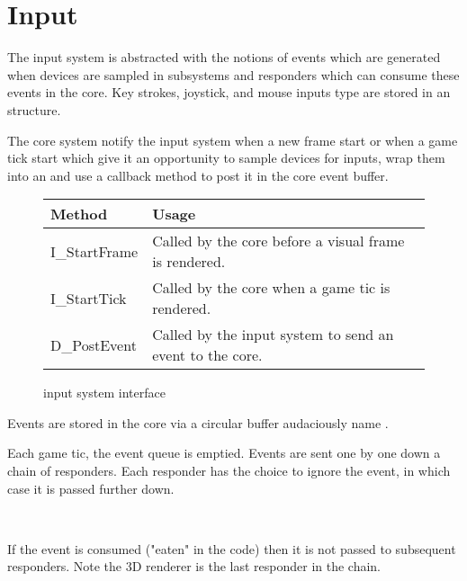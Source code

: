 \section{Input}
The input system is abstracted with the notions of events which are generated when devices are sampled in subsystems and responders which can consume these events in the core. Key strokes, joystick, and mouse inputs type are stored in an  structure.\\
\par
{}
\par
The core system notify the input system when a new frame start or when a game tick start which give it an opportunity to sample devices for inputs, wrap them into an  and use a callback method to post it in the core event buffer.\\
\par
\begin{figure}[H]
\centering  
\begin{tabularx}{\textwidth}{ L{0.6}  L{1.4}}
  \toprule
  \textbf{Method} &  \textbf{Usage}\\
  \toprule 
  I\_StartFrame & Called by the core before a visual frame is rendered.\\
  I\_StartTick & Called by the core when a game tic is rendered.\\
  
  D\_PostEvent & Called by the input system to send an event to the core.\\
   \toprule
\end{tabularx}
\caption{\doom input system interface}
\end{figure}
\par
Events are stored in the core via a circular buffer audaciously name .\\
\par
{}

\par
Each game tic, the event queue is emptied. Events are sent one by one down a chain of responders. Each responder has the choice to ignore the event, in which case it is passed further down.\\
\par
{}\\
 \par If the event is consumed ("eaten" in the code) then it is not passed to subsequent responders. Note the 3D renderer is the last responder in the chain.\\
 

